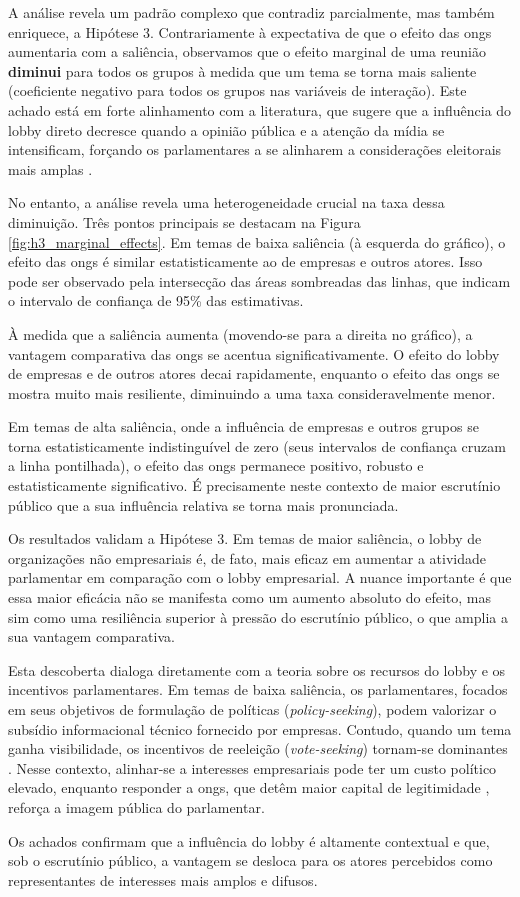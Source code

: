 A análise revela um padrão complexo que contradiz parcialmente, mas também enriquece, a Hipótese 3. Contrariamente à expectativa de que o efeito das \acrshort{ong}s aumentaria com a saliência, observamos que o efeito marginal de uma reunião \textbf{diminui} para todos os grupos à medida que um tema se torna mais saliente (coeficiente negativo para todos os grupos nas variáveis de interação). Este achado está em forte alinhamento com a literatura, que sugere que a influência do lobby direto decresce quando a opinião pública e a atenção da mídia se intensificam, forçando os parlamentares a se alinharem a considerações eleitorais mais amplas \cite{mahoney_lobbying_2007, kollman1998outside}.

No entanto, a análise revela uma heterogeneidade crucial na taxa dessa diminuição. Três pontos principais se destacam na Figura \ref{fig:h3_marginal_effects}. Em temas de baixa saliência (à esquerda do gráfico), o efeito das \acrshort{ong}s é similar estatisticamente ao de empresas e outros atores. Isso pode ser observado pela intersecção das áreas sombreadas das linhas, que indicam o intervalo de confiança de 95\% das estimativas.
    
À medida que a saliência aumenta (movendo-se para a direita no gráfico), a vantagem comparativa das \acrshort{ong}s se acentua significativamente. O efeito do lobby de empresas e de outros atores decai rapidamente, enquanto o efeito das \acrshort{ong}s se mostra muito mais resiliente, diminuindo a uma taxa consideravelmente menor.
    
Em temas de alta saliência, onde a influência de empresas e outros grupos se torna estatisticamente indistinguível de zero (seus intervalos de confiança cruzam a linha pontilhada), o efeito das \acrshort{ong}s permanece positivo, robusto e estatisticamente significativo. É precisamente neste contexto de maior escrutínio público que a sua influência relativa se torna mais pronunciada.

Os resultados validam a Hipótese 3. Em temas de maior saliência, o lobby de organizações não empresariais é, de fato, mais eficaz em aumentar a atividade parlamentar em comparação com o lobby empresarial. A nuance importante é que essa maior eficácia não se manifesta como um aumento absoluto do efeito, mas sim como uma resiliência superior à pressão do escrutínio público, o que amplia a sua vantagem comparativa.

Esta descoberta dialoga diretamente com a teoria sobre os recursos do lobby e os incentivos parlamentares. Em temas de baixa saliência, os parlamentares, focados em seus objetivos de formulação de políticas (\textit{policy-seeking}), podem valorizar o subsídio informacional técnico fornecido por empresas. Contudo, quando um tema ganha visibilidade, os incentivos de reeleição (\textit{vote-seeking}) tornam-se dominantes \cite{mayhew2004congress}. Nesse contexto, alinhar-se a interesses empresariais pode ter um custo político elevado, enquanto responder a \acrshort{ong}s, que detêm maior capital de legitimidade \cite{bunea2018legitimacy}, reforça a imagem pública do parlamentar.

Os achados confirmam que a influência do lobby é altamente contextual e que, sob o escrutínio público, a vantagem se desloca para os atores percebidos como representantes de interesses mais amplos e difusos.
